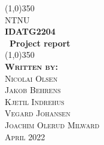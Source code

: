 \documentclass[12pt, a4paper]{report}
\begin{document}
\RaggedRight

\begin{titlepage}

    \begin{center}
    \line(1,0){350}\\
    [5mm]
    \large{NTNU}\\
    \large{\bfseries IDATG2204}\\
    [4mm]
   \huge\textbf{\ Project report}\\
    
    \line(1,0){350}\\

    \vspace*{\fill}
    \LARGE{\textsc{\textbf{Written by:}}}\\
    [4mm]
    \centering\large{\textsc{Nicolai Olsen\\[1mm] Jakob Behrens\\[1mm]  Kjetil Indrehus\\[1mm] Vegard Johansen \\[1mm] Joachim Olerud Milward}}\\
    [7mm]
    \large{\textsc{April 2022}}
    
    
    \end{center}

\end{titlepage}

\tableofcontents
\newpage


\end{document}
